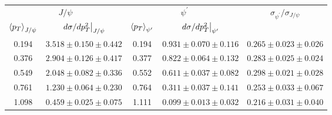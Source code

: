 \begin{tabular}{cc|cc|c}
\hline
\multicolumn{2}{c|}{$J/\psi$} &
  \multicolumn{2}{c|}{$\psi^{\prime}$} &
  \multirow{2}{*}{$\sigma_{\psi^\prime}/\sigma_{J/\psi}$} \\ \cline{1-4}
$\expval{p_T}_{J/\psi}$ &
  $\eval{d\sigma/dp^2_T}_{J/\psi}$ &
  $\expval{p_T}_{\psi^\prime}$ &
  $\eval{d\sigma/dp^2_T}_{\psi^\prime}$ &
   \\ \hline
0.194 & $3.518\pm0.150\pm0.442$ & 0.194 & $0.931\pm0.070\pm0.116$ & $0.265\pm0.023\pm0.026$ \\
0.376 & $2.904\pm0.126\pm0.417$ & 0.377 & $0.822\pm0.064\pm0.132$ & $0.283\pm0.025\pm0.024$ \\
0.549 & $2.048\pm0.082\pm0.336$ & 0.552 & $0.611\pm0.037\pm0.082$ & $0.298\pm0.021\pm0.028$ \\
0.761 & $1.230\pm0.064\pm0.230$ & 0.764 & $0.311\pm0.037\pm0.141$ & $0.253\pm0.033\pm0.067$ \\
1.098 & $0.459\pm0.025\pm0.075$ & 1.111 & $0.099\pm0.013\pm0.032$ & $0.216\pm0.031\pm0.040$ \\ \hline
\end{tabular}

